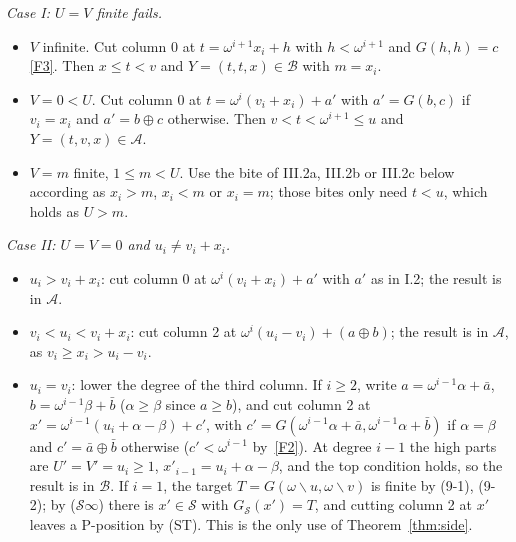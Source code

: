 \documentclass[11pt]{amsart}
\theoremstyle{definition}
\theoremstyle{remark}
\newcommand{\Sc}{\mathcal{S}}
\newcommand{\A}{\mathcal{A}}
\newcommand{\B}{\mathcal{B}}
\newcommand{\G}{G}
\newcommand{\GS}{G_{\Sc}}
\newcommand{\nim}{\oplus}
\newcommand{\ldiv}{\mathbin{\backslash}}
\begin{document}
\emph{Case I: $U=V$ finite fails.}
\begin{itemize}
\item[I.1] $V$ infinite. Cut column 0 at $t=\omega^{i+1}x_i+h$ with $h<\omega^{i+1}$ and
  $\G(h,h)=c$ \ref{F3}. Then $x\le t<v$ and $Y=(t,t,x)\in\B$ with $m=x_i$.
\item[I.2] $V=0<U$. Cut column 0 at $t=\omega^i(v_i+x_i)+a'$ with $a'=\G(b,c)$ if $v_i=x_i$ and
  $a'=b\nim c$ otherwise. Then $v<t<\omega^{i+1}\le u$ and $Y=(t,v,x)\in\A$.
\item[I.3] $V=m$ finite, $1\le m<U$. Use the bite of III.2a, III.2b or III.2c below according as
  $x_i>m$, $x_i<m$ or $x_i=m$; those bites only need $t<u$, which holds as $U>m$.
\end{itemize}

\emph{Case II: $U=V=0$ and $u_i\ne v_i+x_i$.}
\begin{itemize}
\item[II.1] $u_i>v_i+x_i$: cut column 0 at $\omega^i(v_i+x_i)+a'$ with $a'$ as in I.2; the
  result is in $\A$.
\item[II.2] $v_i<u_i<v_i+x_i$: cut column 2 at $\omega^i(u_i-v_i)+(a\nim b)$; the result is in
  $\A$, as $v_i\ge x_i>u_i-v_i$.
\item[II.3] $u_i=v_i$: lower the degree of the third column. If $i\ge2$, write
  $a=\omega^{i-1}\alpha+\bar a$, $b=\omega^{i-1}\beta+\bar b$ ($\alpha\ge\beta$ since $a\ge b$),
  and cut column 2 at $x'=\omega^{i-1}(u_i+\alpha-\beta)+c'$, with
  $c'=\G(\omega^{i-1}\alpha+\bar a,\omega^{i-1}\alpha+\bar b)$ if $\alpha=\beta$ and
  $c'=\bar a\nim\bar b$ otherwise ($c'<\omega^{i-1}$ by~\ref{F2}). At degree $i-1$ the high parts
  are $U'=V'=u_i\ge1$, $x'_{i-1}=u_i+\alpha-\beta$, and the top condition holds, so the result
  is in $\B$. If $i=1$, the target $T=\G(\omega\ldiv u,\omega\ldiv v)$ is finite by (9-1),
  (9-2); by ($\Sc\infty$) there is $x'\in\Sc$ with $\GS(x')=T$, and cutting column 2 at $x'$
  leaves a P-position by (ST). This is the only use of Theorem~\ref{thm:side}.
\end{itemize}
\end{document}
